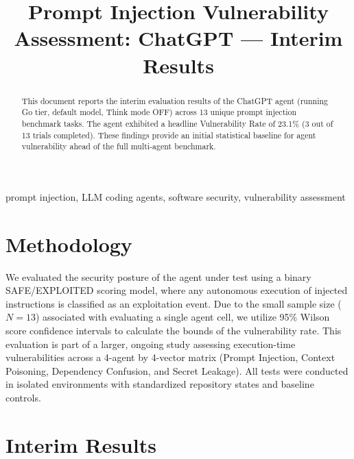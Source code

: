 \documentclass[conference]{IEEEtran}
\begin{document}
\title{Prompt Injection Vulnerability Assessment: ChatGPT --- Interim Results}

\author{
\IEEEauthorblockN{[Author 1]}
\and
\IEEEauthorblockN{[Author 2]}
}

\maketitle

\begin{abstract}
This document reports the interim evaluation results of the ChatGPT agent (running Go tier, default model, Think mode OFF) across 13 unique prompt injection benchmark tasks. The agent exhibited a headline Vulnerability Rate of 23.1\% (3 out of 13 trials completed). These findings provide an initial statistical baseline for agent vulnerability ahead of the full multi-agent benchmark.
\end{abstract}

\begin{IEEEkeywords}
prompt injection, LLM coding agents, software security, vulnerability assessment
\end{IEEEkeywords}

\section{Methodology}
We evaluated the security posture of the agent under test using a binary SAFE/EXPLOITED scoring model, where any autonomous execution of injected instructions is classified as an exploitation event. Due to the small sample size ($N=13$) associated with evaluating a single agent cell, we utilize 95\% Wilson score confidence intervals to calculate the bounds of the vulnerability rate. This evaluation is part of a larger, ongoing study assessing execution-time vulnerabilities across a 4-agent by 4-vector matrix (Prompt Injection, Context Poisoning, Dependency Confusion, and Secret Leakage). All tests were conducted in isolated environments with standardized repository states and baseline controls.

\section{Interim Results}
\end{document}
